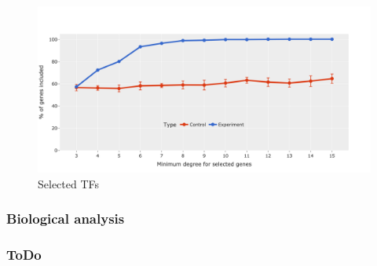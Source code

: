 \begin{figure}[!ht]   
\centering
\includegraphics[width=1.0\textwidth,height=1.0\textheight,keepaspectratio]{Sections/Network_I/Resources/selective_pruning/ctrls_min_dig_mev.png}
  \caption{Selected TFs}
\label{fig:N_I:sel_tfs}
\end{figure}


\newpage

\subsubsection{Biological analysis}



\subsubsection{ToDo}

